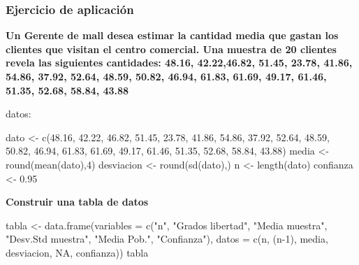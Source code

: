 \documentclass[
]{article}
\newenvironment{Shaded}{\begin{snugshade}}{\end{snugshade}}
\newcommand{\AttributeTok}[1]{\textcolor[rgb]{0.77,0.63,0.00}{#1}}
\newcommand{\ConstantTok}[1]{\textcolor[rgb]{0.00,0.00,0.00}{#1}}
\newcommand{\DecValTok}[1]{\textcolor[rgb]{0.00,0.00,0.81}{#1}}
\newcommand{\FloatTok}[1]{\textcolor[rgb]{0.00,0.00,0.81}{#1}}
\newcommand{\FunctionTok}[1]{\textcolor[rgb]{0.00,0.00,0.00}{#1}}
\newcommand{\NormalTok}[1]{#1}
\newcommand{\OtherTok}[1]{\textcolor[rgb]{0.56,0.35,0.01}{#1}}
\newcommand{\StringTok}[1]{\textcolor[rgb]{0.31,0.60,0.02}{#1}}
\begin{document}
\hypertarget{ejercicio-de-aplicaciuxf3n-3}{%
\subsubsection{Ejercicio de
aplicación}\label{ejercicio-de-aplicaciuxf3n-3}}

\textbf{Un Gerente de mall desea estimar la cantidad media que gastan
los clientes que visitan el centro comercial. Una muestra de 20 clientes
revela las siguientes cantidades: 48.16, 42.22,46.82, 51.45, 23.78,
41.86, 54.86, 37.92, 52.64, 48.59, 50.82, 46.94, 61.83, 61.69, 49.17,
61.46, 51.35, 52.68, 58.84, 43.88}

datos:

\begin{Shaded}
\begin{Highlighting}[]
\NormalTok{dato }\OtherTok{\textless{}{-}} \FunctionTok{c}\NormalTok{(}\FloatTok{48.16}\NormalTok{, }\FloatTok{42.22}\NormalTok{, }\FloatTok{46.82}\NormalTok{, }\FloatTok{51.45}\NormalTok{, }\FloatTok{23.78}\NormalTok{, }\FloatTok{41.86}\NormalTok{, }\FloatTok{54.86}\NormalTok{, }\FloatTok{37.92}\NormalTok{, }\FloatTok{52.64}\NormalTok{, }\FloatTok{48.59}\NormalTok{, }\FloatTok{50.82}\NormalTok{, }\FloatTok{46.94}\NormalTok{, }\FloatTok{61.83}\NormalTok{, }\FloatTok{61.69}\NormalTok{, }\FloatTok{49.17}\NormalTok{, }\FloatTok{61.46}\NormalTok{, }\FloatTok{51.35}\NormalTok{, }\FloatTok{52.68}\NormalTok{, }\FloatTok{58.84}\NormalTok{, }\FloatTok{43.88}\NormalTok{)}
\NormalTok{media }\OtherTok{\textless{}{-}} \FunctionTok{round}\NormalTok{(}\FunctionTok{mean}\NormalTok{(dato),}\DecValTok{4}\NormalTok{)}
\NormalTok{desviacion }\OtherTok{\textless{}{-}} \FunctionTok{round}\NormalTok{(}\FunctionTok{sd}\NormalTok{(dato),)}
\NormalTok{n }\OtherTok{\textless{}{-}} \FunctionTok{length}\NormalTok{(dato)}
\NormalTok{confianza }\OtherTok{\textless{}{-}} \FloatTok{0.95}
\end{Highlighting}
\end{Shaded}

\textbf{Construir una tabla de datos}

\begin{Shaded}
\begin{Highlighting}[]
\NormalTok{tabla }\OtherTok{\textless{}{-}} \FunctionTok{data.frame}\NormalTok{(}\AttributeTok{variables =} \FunctionTok{c}\NormalTok{(}\StringTok{"n"}\NormalTok{, }\StringTok{"Grados libertad"}\NormalTok{, }\StringTok{"Media muestra"}\NormalTok{, }\StringTok{"Desv.Std muestra"}\NormalTok{, }\StringTok{"Media Pob."}\NormalTok{, }\StringTok{"Confianza"}\NormalTok{), }\AttributeTok{datos =} \FunctionTok{c}\NormalTok{(n, (n}\DecValTok{{-}1}\NormalTok{), media, desviacion, }\ConstantTok{NA}\NormalTok{, confianza)) }
\NormalTok{tabla}
\end{Highlighting}
\end{Shaded}
\end{document}
